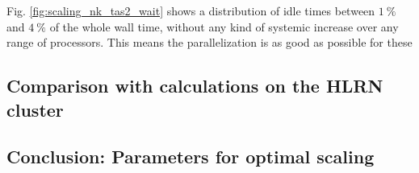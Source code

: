\documentclass[main.tex]{subfiles}
\begin{document}
Fig. \ref{fig:scaling_nk_tas2_wait} shows a distribution of idle times between \(\SI{1}{\percent}\) and \(\SI{4}{\percent}\) of the whole wall time, without any kind of systemic increase over any range of processors.
This means the parallelization is as good as possible for these 


\subsection{Comparison with calculations on the HLRN cluster}

\subsection{Conclusion: Parameters for optimal scaling}
\end{document}
